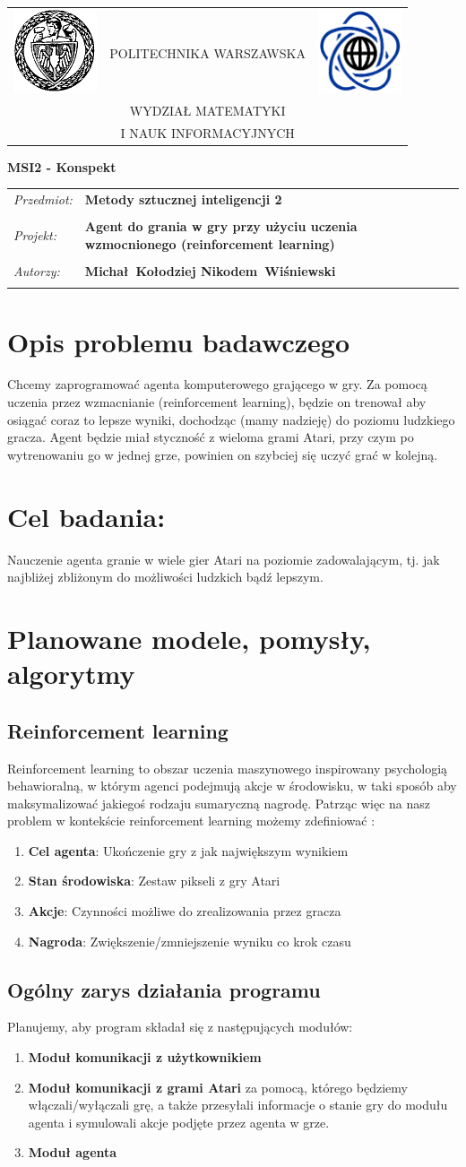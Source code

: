 \documentclass[12pt]{article}
\renewcommand{\maketitle}{
\begin{titlepage}
\begin{table}[t]
\centering
\begin{tabular}[t]{lcr}
 \includegraphics[width=70pt,height=70pt]{PW} & POLITECHNIKA WARSZAWSKA & \includegraphics[width=70pt,height=70pt]{MiNI}\\
& WYDZIAŁ MATEMATYKI & \\
& I NAUK INFORMACYJNYCH &
\end{tabular}
\end{table}
\vspace*{3cm}
  \begin{center}
    \LARGE
    \textbf {MSI2 - Konspekt}\\
   \vspace*{2 cm}
\begin{table}[!htp]
\begin{tabular}{p{4cm}p{9cm}}
\textit{Przedmiot:} &\textbf {Metody sztucznej inteligencji 2} \\
\\
\textit{Projekt:} &\textbf {Agent do grania w gry przy użyciu uczenia wzmocnionego (reinforcement learning)} \\
\\
\textit{Autorzy:} &\textbf {Michał~Kołodziej \newline Nikodem~Wiśniewski} \\
\\
\end{tabular}
\end{table}

\vspace{5 cm}
  \center{\small Warszawa, dnia \today}
\end{center}
\end{titlepage}
}
\begin{document}
\maketitle


\section{Opis problemu badawczego}
Chcemy zaprogramować agenta komputerowego grającego w gry. Za pomocą uczenia przez wzmacnianie (reinforcement learning), będzie on trenował aby osiągać coraz to lepsze wyniki, dochodząc (mamy nadzieję) do poziomu ludzkiego gracza. Agent będzie miał styczność z wieloma grami Atari, przy czym po wytrenowaniu go w jednej grze, powinien on szybciej się uczyć grać w kolejną. 


\section{Cel badania:}
Nauczenie agenta granie w wiele gier Atari na poziomie zadowalającym, tj. jak najbliżej zbliżonym do możliwości ludzkich bądź lepszym.

\section{Planowane modele, pomysły, algorytmy}
\subsection{Reinforcement learning}
Reinforcement learning to obszar uczenia maszynowego inspirowany psychologią behawioralną, w którym agenci podejmują akcje w środowisku, w taki sposób aby maksymalizować jakiegoś rodzaju sumaryczną nagrodę.
Patrząc więc na nasz problem w kontekście reinforcement learning możemy zdefiniować :
\begin{enumerate}
\item \textbf{Cel agenta}: Ukończenie gry z jak największym wynikiem
\item \textbf{Stan środowiska}: Zestaw pikseli z gry Atari
\item \textbf{Akcje}: Czynności możliwe do zrealizowania przez gracza
\item \textbf{Nagroda}: Zwiększenie/zmniejszenie wyniku co krok czasu
\end{enumerate}

\subsection{Ogólny zarys działania programu}
Planujemy, aby program składał się z następujących modułów:
\begin{enumerate}
\item \textbf{Moduł komunikacji z użytkownikiem}
\item \textbf{Moduł komunikacji z grami Atari} za pomocą, którego będziemy włączali/wyłączali grę, a także przesyłali informacje o stanie gry do modułu agenta i symulowali akcje podjęte przez agenta w grze.
\item \textbf{Moduł agenta}
\end{enumerate}
\end{document}
